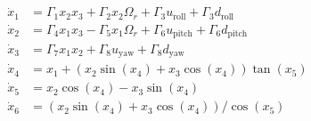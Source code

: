 \documentclass[3p,times]{elsarticle}
\begin{document}


\begin{align}\label{eq:diffeq}
	\dot x_1 &= \Gamma_1x_2 x_3 + \Gamma_2 x_2 \Omega_r + \Gamma_3u_{\text{roll}} + \Gamma_3d_{\text{roll}} \\[0.5em]
\dot x_2 &= \Gamma_4 x_1 x_3 - \Gamma_5 x_1 \Omega_r +  \Gamma_6u_{\text{pitch}} + \Gamma_6d_{\text{pitch}}\\[0.5em] \label{eq:diffeq-mid}
\dot x_3 &= \Gamma_7x_1 x_2 +  \Gamma_8u_{\text{yaw}} + \Gamma_8d_{\text{yaw}}\\[0.5em] 
\dot x_4 &= x_1 + (x_2\sin(x_4) + x_3\cos(x_4))\tan(x_5)
\\[0.5em]
\dot x_5 &= x_2\cos(x_4) - x_3\sin(x_4)\\[0.5em]
\dot x_6 &= (x_2\sin(x_4) + x_3\cos(x_4))/\cos(x_5) \label{eq:diffeq-end}
\end{align}
\end{document}
